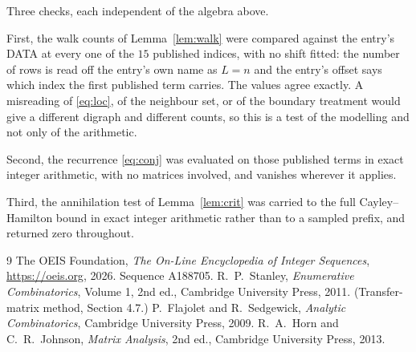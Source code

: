\documentclass[11pt,a4paper]{article}
\theoremstyle{plain}
\theoremstyle{definition}
\begin{document}
Three checks, each independent of the algebra above.

First, the walk counts of Lemma~\ref{lem:walk} were compared against the entry's DATA at
every one of the $15$ published indices, with no shift fitted: the number of rows is
read off the entry's own name as $L=n$ and the entry's offset says which index the first
published term carries. The values agree exactly. A misreading of \eqref{eq:loc}, of the
neighbour set, or of the boundary treatment would give a different digraph and different
counts, so this is a test of the modelling and not only of the arithmetic.

Second, the recurrence \eqref{eq:conj} was evaluated on those published terms in exact
integer arithmetic, with no matrices involved, and vanishes wherever it applies.

Third, the annihilation test of Lemma~\ref{lem:crit} was carried to the full
Cayley--Hamilton bound in exact integer arithmetic rather than to a sampled prefix, and
returned zero throughout.

\begin{thebibliography}{9}
 The OEIS Foundation, \emph{The On-Line Encyclopedia of Integer
Sequences}, \url{https://oeis.org}, 2026. Sequence A188705.
 R.~P.~Stanley, \emph{Enumerative Combinatorics}, Volume 1, 2nd ed.,
Cambridge University Press, 2011. (Transfer-matrix method, Section 4.7.)
 P.~Flajolet and R.~Sedgewick, \emph{Analytic Combinatorics}, Cambridge
University Press, 2009.
 R.~A.~Horn and C.~R.~Johnson, \emph{Matrix Analysis}, 2nd ed., Cambridge
University Press, 2013.
\end{thebibliography}
\end{document}
